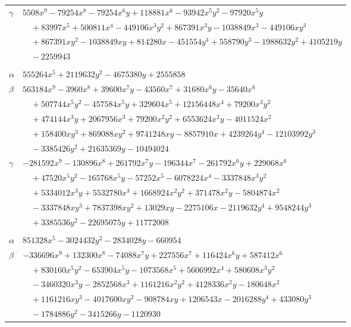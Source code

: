 \documentclass[11pt]{article}
\begin{document}
\begin{longtable}{@{}ll@{}}
$\gamma$ & $5508x^{9}-79254x^{8}-79254x^{6}y+118881x^{6}-93942x^{5}y^{2}-97920x^{5}y$\\
 & $\quad +83997x^{5}+500811x^{4}-449106x^{3}y^{2}+867391x^{3}y-1038849x^{3}-449106xy^{3}$\\
 & $\quad +867391xy^{2}-1038849xy+814280x-451554y^{4}+558790y^{3}-1988632y^{2}+4105219y$\\
 & $\quad -2259943$\\
\addlinespace[3pt]
\multicolumn{2}{@{}l}{$\{i,j\}=\{23,41\}$, $k_{ij}=2\cdot 5\cdot 11$}\\
$\alpha$ & $555264x^{5}+2119632y^{2}-4675380y+2555858$\\
$\beta$ & $563184x^{9}-3960x^{8}+39600x^{7}y-43560x^{7}+31680x^{6}y-35640x^{6}$\\
 & $\quad +507744x^{5}y^{2}-457584x^{5}y+329604x^{5}+12156448x^{4}+79200x^{3}y^{2}$\\
 & $\quad +474144x^{3}y+2067956x^{3}+79200x^{2}y^{2}+6553624x^{2}y-4011524x^{2}$\\
 & $\quad +158400xy^{3}+869088xy^{2}+9741248xy-8857910x+4239264y^{4}-12103992y^{3}$\\
 & $\quad -3385426y^{2}+21635369y-10494024$\\
$\gamma$ & $-281592x^{9}-130896x^{8}+261792x^{7}y-196344x^{7}-261792x^{6}y+229068x^{6}$\\
 & $\quad +47520x^{5}y^{2}-165768x^{5}y-57252x^{5}-6078224x^{4}-3337848x^{3}y^{2}$\\
 & $\quad +5334012x^{3}y+5532780x^{3}+1668924x^{2}y^{2}+371478x^{2}y-5804874x^{2}$\\
 & $\quad -3337848xy^{3}+7837398xy^{2}+13029xy-2275106x-2119632y^{4}+9548244y^{3}$\\
 & $\quad +3385536y^{2}-22695075y+11772008$\\
\addlinespace[3pt]
\multicolumn{2}{@{}l}{$\{i,j\}=\{24,31\}$, $k_{ij}=2^{2}\cdot 3\cdot 5$}\\
$\alpha$ & $851328x^{5}-3024432y^{2}-2834028y-660954$\\
$\beta$ & $-336696x^{9}+132300x^{8}-74088x^{7}y+227556x^{7}+116424x^{6}y+587412x^{6}$\\
 & $\quad +830160x^{5}y^{2}-653904x^{5}y-1073568x^{5}+5606992x^{4}+580608x^{3}y^{2}$\\
 & $\quad -3460320x^{3}y-2852568x^{3}+1161216x^{2}y^{2}+4128336x^{2}y-180648x^{2}$\\
 & $\quad +1161216xy^{3}-4017600xy^{2}-908784xy+1206543x-2016288y^{4}+433080y^{3}$\\
 & $\quad -1784886y^{2}-3415266y-1120930$\\

\end{longtable}
\end{document}
